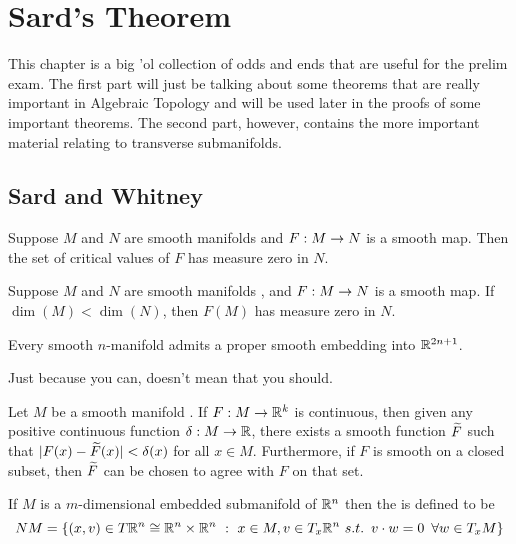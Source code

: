 \newpage\setcounter{section}{5}
\section{Sard's Theorem}

This chapter is a big 'ol collection of odds and ends that are useful for the prelim exam. The first part will just be talking about some theorems that are really important in Algebraic Topology and will be used later in the proofs of some important theorems. The second part, however, contains the more important material relating to transverse submanifolds.

\subsection{Sard and Whitney}

\setcounter{thm}{9}

\begin{thm}
Suppose $M$ and $N$ are smooth manifolds \wowob and $F:M\rightarrow N$ is a smooth map. Then the set of critical values of $F$ has measure zero in $N$.
\end{thm}

\begin{cor}
Suppose $M$ and $N$ are smooth manifolds \wowob, and $F:M\rightarrow N$ is a smooth map. If $\dim(M) < \dim(N)$, then $F(M)$ has measure zero in $N$.
\end{cor}

\begin{thm}
Every smooth $n$-manifold \wowob admits a proper smooth embedding into $\mathbb{R}^{2n + 1}$.
\end{thm}

\nb Just because you can, doesn't mean that you should.

\setcounter{thm}{20}

\begin{thm}
Let $M$ be a smooth manifold \wowob. If $F:M\rightarrow \mathbb{R}^k$ is continuous, then given any positive continuous function $\delta:M\rightarrow \mathbb{R}$, there exists a smooth function $\widetilde F$ such that $|F(x) - \widetilde F(x)|< \delta(x)$ for all $x\in M$. Furthermore, if $F$ is smooth on a closed subset, then $\widetilde F$ can be chosen to agree with $F$ on that set.
\end{thm}

\dfn If $M$ is a $m$-dimensional embedded submanifold of $\mathbb{R}^n$ then the  is defined to be
\[NM = \{(x,v)\in T\mathbb{R}^n\cong \mathbb{R}^n\times\mathbb{R}^n\ :\ x\in M,v\in T_x\mathbb{R}^n\ s.t.\,\,\, v\cdot w = 0 \,\,\,\forall w\in T_xM\}\]

